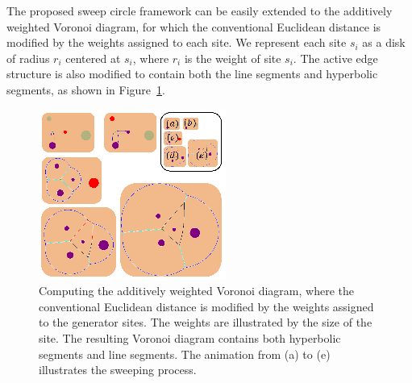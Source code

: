 {{%
The proposed sweep circle framework can be easily extended to the
additively weighted Voronoi diagram, for which the conventional
Euclidean distance is modified by the weights assigned to each site. We
represent each site $s_i$ as a disk of radius $r_i$ centered at
$s_i$, where $r_i$ is the weight of site $s_i$. The active edge
structure is also modified to contain both the line segments and
hyperbolic segments, as shown in Figure~\ref{fig:averageUV}.


\begin{figure}[!htbp]
\begin{center}
\includegraphics[width=0.9\columnwidth]{figs/sweepcircle/weightedVoronoi.png}
\end{center}
\vspace{-0.1in}\caption{Computing the additively weighted Voronoi
diagram, where the conventional Euclidean distance is modified by the
weights assigned to the generator sites. The weights are illustrated
by the size of the site. The resulting Voronoi diagram contains both
hyperbolic segments and line segments. The animation from (a) to (e)
illustrates the sweeping process. } \label{fig:averageUV}
\vspace{-2mm}
\end{figure}


}}
